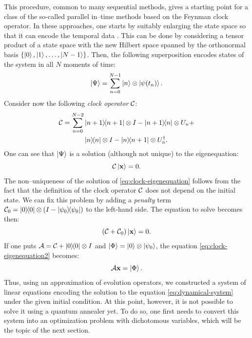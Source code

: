 This procedure, common to many sequential methods, gives a starting point for a
class of the so-called parallel in--time methods based on the Feynman clock
operator. In these approaches, one starts by suitably enlarging the state space
so that it can encode the temporal data \cite{feynmanclock}. This can be done
by considering a tensor product of a state space with the new Hilbert space
spanned by the orthonormal basis $\{\ket{0}, \ket{1}, \ldots, \ket{N-1}\}$.
Then, the following superposition encodes states of the system in all $N$
moments of time:
%
\begin{equation}
  \ket{\Psi} = \sum_{n=0}^{N-1} \ket{n} \otimes \ket{\psi(t_n)}.
\end{equation}
Consider now the following \emph{clock operator} $\mathcal{C}$:
\begin{equation}
  \label{eq:clock2}
  \begin{split}
    \mathcal{C}
    =
    \sum_{n=0}^{N-2}
    &\ketbra{n+1}{n+1} \otimes I - \ketbra{n+1}{n} \otimes U_n + \\
    &\ketbra{n}{n} \otimes I - \ketbra{n}{n+1}\otimes U_{n}^{\dagger}.
  \end{split}
\end{equation}
One can see that $\ket{\Psi}$ is a solution (although not unique) to the
eigenequation:
\begin{equation}
  \label{eq:clock-eigenequation}
  \mathcal{C} \ket{\mathbf{x}} = 0.
\end{equation}
The non--uniqueness of the solution of \eqref{eq:clock-eigenequation} follows
from the fact that the definition of the clock operator $\mathcal{C}$ does not
depend on the initial state. We can fix this problem by adding a \emph{penalty}
term $\mathcal{C}_0 = \ketbra{0}{0}\otimes(I-\ketbra{\psi_0}{\psi_0})$ to the
left-hand side. The equation to solve becomes then:
\begin{equation}
  \label{eq:clock-eigenequation2}
  (\mathcal{C} + \mathcal{C}_0) \ket{\mathbf{x}} = 0.
\end{equation}
If one puts $\mathcal{A}=\mathcal{C} + \ketbra{0}{0} \otimes I$ and $\ket{\Phi} =
  \ket{0}\otimes \ket{\psi_0}$, the equation \eqref{eq:clock-eigenequation2}
becomes:
\begin{equation}
  \label{eq:gsys}
  \mathcal{A} \mathbf{x} = \ket{\Phi}.
\end{equation}
Thus, using an approximation of evolution operators, we constructed a system of
linear equations encoding the solution to the equation
\eqref{eq:dynamical-system} under the given initial condition. At this point,
however, it is not possible to solve it using a quantum annealer yet. To do so,
one first needs to convert this system into an optimization problem with
dichotomous variables, which will be the topic of the next section.
